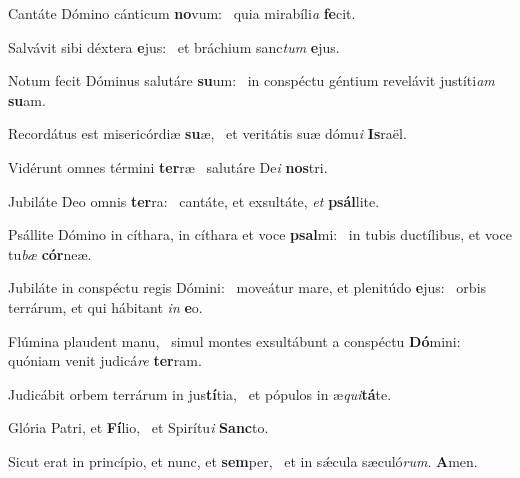 \item Cantáte Dómino cánticum \textbf{no}vum:~\psstar{} quia mirabíli\textit{a} \textbf{fe}cit.
\item Salvávit sibi déxtera \textbf{e}jus:~\psstar{} et bráchium sanc\textit{tum} \textbf{e}jus.
\item Notum fecit Dóminus salutáre \textbf{su}um:~\psstar{} in conspéctu géntium revelávit justíti\textit{am} \textbf{su}am.
\item Recordátus est misericórdiæ \textbf{su}æ,~\psstar{} et veritátis suæ dómu\textit{i} \textbf{Is}raël.
\item Vidérunt omnes términi \textbf{ter}ræ~\psstar{} salutáre De\textit{i} \textbf{nos}tri.
\item Jubiláte Deo omnis \textbf{ter}ra:~\psstar{} cantáte, et exsultáte, \textit{et} \textbf{psál}lite.
\item Psállite Dómino in cíthara, in cíthara et voce \textbf{psal}mi:~\psstar{} in tubis ductílibus, et voce tu\textit{bæ} \textbf{cór}neæ.
\item Jubiláte in conspéctu regis Dómini:~\pscross{} moveátur mare, et plenitúdo \textbf{e}jus:~\psstar{} orbis terrárum, et qui hábitant \textit{in} \textbf{e}o.
\item Flúmina plaudent manu,~\pscross{} simul montes exsultábunt a conspéctu \textbf{Dó}mini:~\psstar{} quóniam venit judicá\textit{re} \textbf{ter}ram.
\item Judicábit orbem terrárum in jus\textbf{tí}tia,~\psstar{} et pópulos in æ\textit{qui}\textbf{tá}te.
\item Glória Patri, et \textbf{Fí}lio,~\psstar{} et Spirítu\textit{i} \textbf{Sanc}to.
\item Sicut erat in princípio, et nunc, et \textbf{sem}per,~\psstar{} et in sǽcula sæculó\textit{rum}. \textbf{A}men.